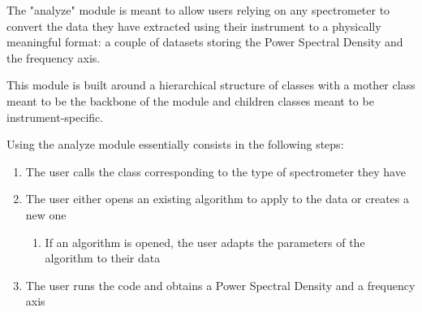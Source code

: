 The "analyze" module is meant to allow users relying on any spectrometer to convert the data they have extracted using their instrument to a physically meaningful format: a couple of datasets storing the Power Spectral Density and the frequency axis. 

This module is built around a hierarchical structure of classes with a mother class meant to be the backbone of the module and children classes meant to be instrument-specific.

Using the analyze module essentially consists in the following steps:
\begin{enumerate}
    \item The user calls the class corresponding to the type of spectrometer they have
    \item The user either opens an existing algorithm to apply to the data or creates a new one
    \begin{enumerate}
        \item If an algorithm is opened, the user adapts the parameters of the algorithm to their data
    \end{enumerate}
    \item The user runs the code and obtains a Power Spectral Density and a frequency axis
\end{enumerate}


